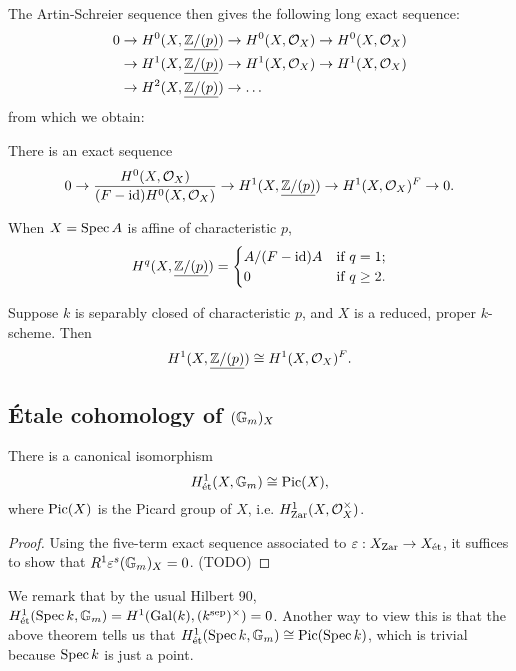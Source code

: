 \documentclass[11pt]{amsart}
\begin{document}
The Artin-Schreier sequence then gives the following long exact sequence:
\begin{align*}
    0 & \to H^0(X, \underline{\mathbb{Z}/(p)}) \to H^0(X, \mathcal{O}_X) \to H^0(X, \mathcal{O}_X) \\
    &\to H^1(X, \underline{\mathbb{Z}/(p)}) \to H^1(X, \mathcal{O}_X) \to H^1(X, \mathcal{O}_X) \\
    &\to H^2(X, \underline{\mathbb{Z}/(p)}) \to\dots
\end{align*}
from which we obtain:

\begin{cor}
    There is an exact sequence
    \[0\to \frac{H^0(X,\mathcal{O}_X)}{(F-\operatorname{id})H^0(X,\mathcal{O}_X)} \to H^1(X, \underline{\mathbb{Z}/(p)}) \to H^1(X, \mathcal{O}_X)^{F}\to 0.\]
\end{cor}

\begin{cor}
    When $X= \operatorname{Spec} A$ is affine of characteristic $p$, 
    \[H^q(X, \underline{\mathbb{Z}/(p)}) = \begin{cases}
    A/(F-\operatorname{id})A & \text{if } q = 1;\\
    0 & \text{if } q\ge 2.
    \end{cases}\]
\end{cor}

\begin{cor}
    Suppose $k$ is separably closed of characteristic $p$, and $X$ is a reduced, proper $k$-scheme. Then
    \[H^1(X, \underline{\mathbb{Z}/(p)}) \cong H^1(X,\mathcal{O}_X)^F.\]
\end{cor}

\subsection{\'Etale cohomology of $(\mathbb{G}_m)_X$}


\begin{thm}
    There is a canonical isomorphism
    \[H^1_{\operatorname{\acute{e}t}}(X, \mathbb{G}_m) \cong \operatorname{Pic}(X),\]
    where $\operatorname{Pic}(X)$ is the Picard group of $X$, i.e. $H_{\operatorname{Zar}}^1(X, \mathcal{O}_X^{\times})$.
\end{thm}

\begin{proof}
    Using the five-term exact sequence associated to $\varepsilon:X_{\operatorname{Zar}}\to X_{\operatorname{\acute{e}t}}$, it suffices to show that $R^1\varepsilon^s(\mathbb{G}_m)_X = 0$. (TODO)
\end{proof}

We remark that by the usual Hilbert 90, $H^1_{\operatorname{\acute{e}t}}(\operatorname{Spec} k, \mathbb{G}_m) = H^1(\operatorname{Gal}(k), (k^{\operatorname{sep}})^{\times}) = 0$. Another way to view this is that the above theorem tells us that $H^1_{\operatorname{\acute{e}t}}(\operatorname{Spec} k, \mathbb{G}_m) \cong \operatorname{Pic}(\operatorname{Spec} k)$, which is trivial because $\operatorname{Spec} k$ is just a point.
\end{document}

